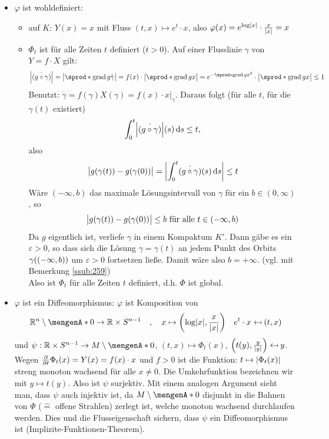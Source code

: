 \begin{itemize}
	\item $\varphi$ ist wohldefiniert:
	\begin{itemize}
		\item auf $K$: $Y(x)=x$ mit Fluss $(t,x) \mapsto e^t \cdot x$, also $\varphi(x) = e^{\log \abs*{x}} \cdot \frac{x}{\abs*{x} } = x $
		\item $\Phi_t$ ist für alle Zeiten $t$ definiert (\oE $t>0$). Auf einer Flusslinie $\gamma$ von $Y = f \cdot X$ gilt:
		\[
			\abs*{\dot{(g \circ  \gamma)}} = \abs[\big]{ \sprod*{\grad g}{\dot{\gamma}} }  = f(x) \cdot \abs[\big]{ \sprod*{\grad g}{x} } = e^{- \sprod*{\grad g}{x}^2 }
			\cdot \abs[\big]{ \sprod*{\grad g}{x} } \le 1
		\]
		Benutzt: $\dot{\gamma} = f(\gamma) X(\gamma)= f(x)\cdot x \Big|_{\gamma}$. Daraus folgt (für alle $t$, für die $\gamma(t)$ existiert)
		\[
			\int_{0} ^{t} \abs*{\dot{(g \circ \gamma)}}(s)  \, \mathrm{d}s \le t , 
		\]
		also 
		\[
			\abs[\big]{ g \enbrace*{\gamma(t)} - g \enbrace*{\gamma(0)}  } = \abs*{ \int_{0} ^{t} \! \dot{(g \circ  \gamma)} (s)  \, \mathrm{d}s } \le t  
		\]
		Wäre $(-\infty, b)$ das maximale Lösungsintervall von $\gamma$ für ein $b \in (0,\infty)$, so 
		\[
			\abs[\big]{ g \enbrace*{\gamma(t)} - g \enbrace*{\gamma(0)} } \le b \text{ für alle } t \in (-\infty,b)
		\]
		Da $g$ eigentlich ist, verliefe $\gamma$ in einem Kompaktum $K'$. Dann gäbe es ein $\varepsilon>0$, so dass sich die Lösung $\gamma= \gamma(t)$ an jedem Punkt des 
		Orbits $\gamma \enbrace*{(-\infty, b)}$ um $\varepsilon >0$ fortsetzen ließe. Damit wäre also $b= + \infty$. \hfill (vgl. mit Bemerkung \ref{ssub:259}) \\
		Also ist $\Phi_t$ für alle Zeiten $t$ definiert, d.h. $\Phi$ ist global.
	\end{itemize}
	\item $\varphi$ ist ein Diffeomorphismus: $\varphi$ ist Komposition von 
	\[
		\mathds{R}^n \setminus \set{0} \to \mathds{R} \times S^{n-1} \quad ,\quad x \mapsto \enbrace*{ \log \abs*{x}, \frac{x}{\abs*{x} }  } \quad  e^t \cdot x \mapsfrom 
		(t,x)
	\]
	und $\psi : \mathds{R} \times S^{n-1} \to M \setminus \set{0}$, $(t,x) \mapsto \Phi_t(x)$, $\enbrace*{t(y), \frac{y}{\abs*{y} }}  \mapsfrom y$. Wegen 
	$\diff{}{t} \Phi_t(x) = Y(x) = f(x) \cdot x$ und $f>0$ ist die Funktion: $t \mapsto \abs*{\Phi_t(x)}$ streng monoton wachsend für alle $x \not= 0$. Die Umkehrfunktion
	bezeichnen wir mit $y \mapsto t(y)$. Also ist $\psi$ surjektiv. Mit einem analogen Argument sieht man, dass $\psi$ auch injektiv ist, da $M \setminus \set{0}$ disjunkt
	in die Bahnen von $\Phi$ ($\widehat{=}$ offene Strahlen) zerlegt ist, welche monoton wachsend durchlaufen werden. Dies und die Flusseigenschaft sichern, dass $\psi$
	ein Diffeomorphismus ist (Implizite-Funktionen-Theorem). \bewende
\end{itemize}
